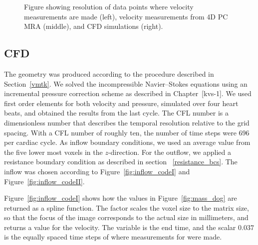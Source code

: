 \begin{figure}
  \begin{center}
  \end{center}
  \caption{Figure showing resolution of data points where velocity
    measurements are made (left), velocity measurements from 4D PC MRA
    (middle), and CFD simulations (right).}
  \label{fig:dog_mri}
\end{figure}

\subsection{CFD}

The geometry was produced according to the procedure described in
Section~\ref{vmtk}. We solved the incompressible Navier--Stokes
equations using an incremental pressure correction scheme as described
in Chapter~[kvs-1]. We used first order elements for both velocity and
pressure, simulated over four heart beats, and obtained the results
from the last cycle. The CFL number is a dimensionless number that
describes the temporal resolution relative to the grid spacing.  With
a CFL number of roughly ten, the number of time steps were 696 per
cardiac cycle. As inflow boundary conditions, we used an average value
from the five lower most voxels in the $z$-direction. For the outflow,
we applied a resistance boundary condition as described in section
~\ref{resistance_bcs}. The inflow was chosen according to
Figure~\ref{fig:inflow_codeI} and Figure~\ref{fig:inflow_codeII}.

Figure~\ref{fig:inflow_codeI} shows how the values in
Figure~\ref{fig:mass_dog} are returned as a spline function. The
factor  scales the voxel size to the matrix size,
so that the focus of the image corresponds to the actual size in
millimeters, and returns a value for the velocity. The 
variable is the end time, and the scalar $0.037$ is the equally spaced
time steps of where measurements for  were made.

